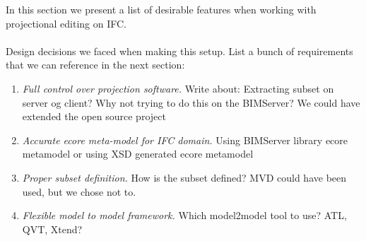 
In this section we present a list of desirable features when working with projectional editing on IFC.
\paragraph{}
Design decisions we faced when making this setup. List a bunch of requirements that we can reference in the next section: 
\begin{enumerate}[itemsep=0pt,parsep=2pt,topsep=10pt]
	\item {\it Full control over projection software.} Write about: Extracting subset on server og client? Why not trying to do this on the BIMServer? We could have extended the open source project
	\item {\it Accurate ecore meta-model for IFC domain.} Using BIMServer library ecore metamodel or using XSD generated ecore metamodel
	\item {\it Proper subset definition.} How is the subset defined? MVD could have been used, but we chose not to.
	\item {\it Flexible model to model framework.} Which model2model tool to use? ATL, QVT, Xtend?
\end{enumerate}